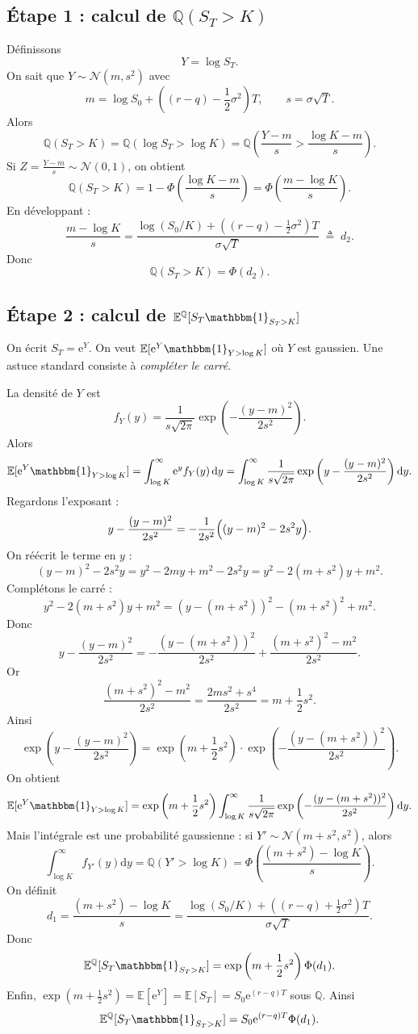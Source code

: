 \documentclass[11pt,a4paper]{report}
\newcommand{\dd}{\mathrm{d}}
\newcommand{\ee}{\mathrm{e}}
\newcommand{\E}{\mathbb{E}}
\newcommand{\Q}{\mathbb{Q}}
\newcommand{\1}{\mathbbm{1}}
\newcommand{\Normal}{\mathcal{N}}
\theoremstyle{definition}
\theoremstyle{plain}
\theoremstyle{remark}
\begin{document}
\subsection{Étape 1 : calcul de $\Q(S_T>K)$}
Définissons
\[
Y = \log S_T.
\]
On sait que $Y\sim \Normal(m, s^2)$ avec
\[
m=\log S_0 + \left((r-q)-\frac12\sigma^2\right)T,\qquad s=\sigma\sqrt{T}.
\]
Alors
\[
\Q(S_T>K) = \Q(\log S_T > \log K) = \Q\left(\frac{Y-m}{s} > \frac{\log K - m}{s}\right).
\]
Si $Z=\frac{Y-m}{s}\sim \Normal(0,1)$, on obtient
\[
\Q(S_T>K) = 1-\Phi\left(\frac{\log K - m}{s}\right)=\Phi\left(\frac{m-\log K}{s}\right).
\]
En développant :
\[
\frac{m-\log K}{s}
=
\frac{\log(S_0/K) + \left((r-q)-\frac12\sigma^2\right)T}{\sigma\sqrt{T}}
\;\triangleq\; d_2.
\]
Donc
\[
\Q(S_T>K)=\Phi(d_2).
\]

\subsection{Étape 2 : calcul de $\E^{\Q}[S_T\1_{S_T>K}]$}
On écrit $S_T=\ee^{Y}$.
On veut $\E[\ee^Y\1_{Y>\log K}]$ où $Y$ est gaussien.
Une astuce standard consiste à \emph{compléter le carré}.

La densité de $Y$ est
\[
f_Y(y)=\frac{1}{s\sqrt{2\pi}}\exp\left(-\frac{(y-m)^2}{2s^2}\right).
\]
Alors
\[
\E[\ee^Y\1_{Y>\log K}]
=\int_{\log K}^{\infty}\ee^{y} f_Y(y)\,\dd y
=\int_{\log K}^{\infty}\frac{1}{s\sqrt{2\pi}}
\exp\left(y-\frac{(y-m)^2}{2s^2}\right)\dd y.
\]
Regardons l'exposant :
\[
y-\frac{(y-m)^2}{2s^2}
=
-\frac{1}{2s^2}\Bigl((y-m)^2-2s^2 y\Bigr).
\]
On réécrit le terme en $y$ :
\[
(y-m)^2-2s^2 y
=
y^2 -2my + m^2 -2s^2 y
=
y^2 -2(m+s^2)y + m^2.
\]
Complétons le carré :
\[
y^2 -2(m+s^2)y + m^2
=
(y-(m+s^2))^2 - (m+s^2)^2 + m^2.
\]
Donc
\[
y-\frac{(y-m)^2}{2s^2}
=
-\frac{(y-(m+s^2))^2}{2s^2} + \frac{(m+s^2)^2-m^2}{2s^2}.
\]
Or
\[
\frac{(m+s^2)^2-m^2}{2s^2} = \frac{2ms^2 + s^4}{2s^2}= m+\frac12 s^2.
\]
Ainsi
\[
\exp\left(y-\frac{(y-m)^2}{2s^2}\right)
=
\exp\left(m+\frac12 s^2\right)\cdot
\exp\left(-\frac{(y-(m+s^2))^2}{2s^2}\right).
\]
On obtient
\[
\E[\ee^Y\1_{Y>\log K}]
=
\exp\left(m+\frac12 s^2\right)\int_{\log K}^{\infty}\frac{1}{s\sqrt{2\pi}}
\exp\left(-\frac{(y-(m+s^2))^2}{2s^2}\right)\dd y.
\]
Mais l'intégrale est une probabilité gaussienne :
si $Y'\sim \Normal(m+s^2,s^2)$, alors
\[
\int_{\log K}^{\infty} f_{Y'}(y)\dd y = \Q(Y'>\log K)=\Phi\left(\frac{(m+s^2)-\log K}{s}\right).
\]
On définit
\[
d_1 = \frac{(m+s^2)-\log K}{s} = \frac{\log(S_0/K)+\left((r-q)+\frac12\sigma^2\right)T}{\sigma\sqrt{T}}.
\]
Donc
\[
\E^{\Q}[S_T\1_{S_T>K}] = \exp\left(m+\frac12 s^2\right)\Phi(d_1).
\]
Enfin, $\exp(m+\tfrac12 s^2)=\E[\ee^Y]=\E[S_T]=S_0\ee^{(r-q)T}$ sous $\Q$.
Ainsi
\[
\E^{\Q}[S_T\1_{S_T>K}] = S_0\ee^{(r-q)T}\Phi(d_1).
\]
\end{document}
